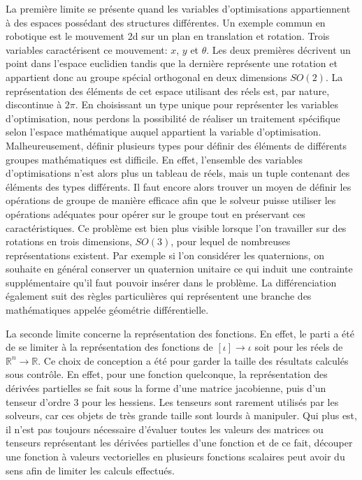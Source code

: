 La première limite se présente quand les variables d'optimisations
appartiennent à des espaces possédant des structures différentes. Un
exemple commun en robotique est le mouvement 2d sur un plan en
translation et rotation. Trois variables caractérisent ce mouvement:
$x$, $y$ et $\theta$. Les deux premières décrivent un point dans
l'espace euclidien tandis que la dernière représente une rotation et
appartient donc au groupe spécial orthogonal en deux dimensions $SO(2)$. La représentation
des éléments de cet espace utilisant des réels est, par nature,
discontinue à $2\pi$. En choisissant un type unique pour représenter
les variables d'optimisation, nous perdons la possibilité de réaliser
un traitement spécifique selon l'espace mathématique auquel appartient
la variable d'optimisation. Malheureusement, définir plusieurs types
pour définir des éléments de différents groupes mathématiques est
difficile. En effet, l'ensemble des variables d'optimisations n'est
alors plus un tableau de réels, mais un tuple contenant des éléments
des types différents. Il faut encore alors trouver un moyen de définir
les opérations de groupe de manière efficace afin que le solveur
puisse utiliser les opérations adéquates pour opérer sur le groupe
tout en préservant ces caractéristiques. Ce problème est bien plus
visible lorsque l'on travailler sur des rotations en trois dimensions,
$SO(3)$, pour lequel de nombreuses représentations existent. Par
exemple si l'on considérer les quaternions, on souhaite en général
conserver un quaternion unitaire ce qui induit une contrainte
supplémentaire qu'il faut pouvoir insérer dans le problème. La
différenciation également suit des règles particulières qui
représentent une branche des mathématiques appelée géométrie
différentielle.

La seconde limite concerne la représentation des fonctions. En effet,
le parti a été de se limiter à la représentation des fonctions de
$[\iota] \rightarrow \iota$ soit pour les réels de $\mathbb{R}^n
\rightarrow \mathbb{R}$. Ce choix de conception a été pour garder la
taille des résultats calculés sous contrôle. En effet, pour une
fonction quelconque, la représentation des dérivées partielles se fait
sous la forme d'une matrice jacobienne, puis d'un
tenseur d'ordre 3 pour les hessiens. Les tenseurs sont
rarement utilisés par les solveurs, car ces objets de très grande
taille sont lourds à manipuler. Qui plus est, il n'est pas toujours
nécessaire d'évaluer toutes les valeurs des matrices ou tenseurs
représentant les dérivées partielles d'une fonction et de ce fait,
découper une fonction à valeurs vectorielles en plusieurs fonctions
scalaires peut avoir du sens afin de limiter les calculs effectués.


